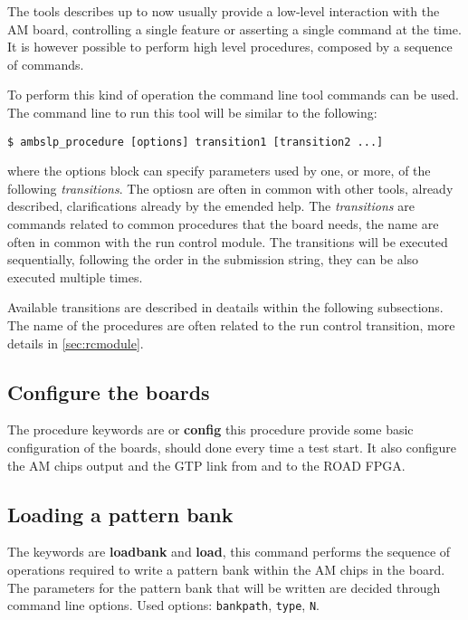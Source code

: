 The tools describes up to now usually provide a low-level
interaction with the AM board, controlling a single feature
or asserting a single command at the time. It is however 
possible to perform high level procedures, composed by a sequence
of commands.

To perform this kind of operation the command line tool
\textbf{\texttt{}} commands can be used. The
command line to run this tool will be similar to the
following:
\begin{verbatim}
$ ambslp_procedure [options] transition1 [transition2 ...]
\end{verbatim}
where the options block can specify parameters used by one, or more,
of the following \emph{transitions}. The optiosn are often in common
with other tools, already described, clarifications already by the emended help.
The \emph{transitions} are commands related to common procedures
that the board needs, the name are often in common with the
run control module. The transitions will be executed
sequentially, following the order in the submission string, they can 
be also executed multiple times.

Available transitions are described in deatails within the following 
subsections. The name of the procedures are often related to the run
control transition, more details in \ref{sec:rcmodule}.

\subsection{Configure the boards}
\label{sec:procconfigure}

The procedure keywords are \textbf{} or \textbf{config}  this procedure provide some basic configuration of the boards, should done every time a test start. It
    also configure the AM chips output and the GTP link from and to the
    ROAD FPGA.

\subsection{Loading a pattern bank}
\label{sec:procloadbank}
The keywords are \textbf{loadbank} and \textbf{load}, 
this command performs the
	sequence of operations required to write a pattern bank within
	the AM chips in the board. The parameters for the pattern bank 
	that will be written are decided through command line options.
	Used options: \texttt{bankpath}, \texttt{type}, \texttt{N}.
    
